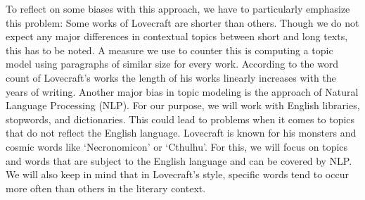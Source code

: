 To reflect on some biases with this approach, we have to particularly emphasize this problem: 
Some works of Lovecraft are shorter than others. Though we do not expect any major differences 
in contextual topics between short and long texts, this has to be noted. A measure we use to 
counter this is computing a topic model using paragraphs of similar size for every work. 
According to the word count of Lovecraft’s works the length of his works linearly increases 
with the years of writing. Another major bias in topic modeling is the approach of Natural 
Language Processing (NLP). For our purpose, we will work with English libraries, stopwords, 
and dictionaries. This could lead to problems when it comes to topics that do not reflect the 
English language. Lovecraft is known for his monsters and cosmic words like ‘Necronomicon’ or 
‘Cthulhu’. For this, we will focus on topics and words that are subject to the English language 
and can be covered by NLP. We will also keep in mind that in Lovecraft’s style, specific words 
tend to occur more often than others in the literary context.